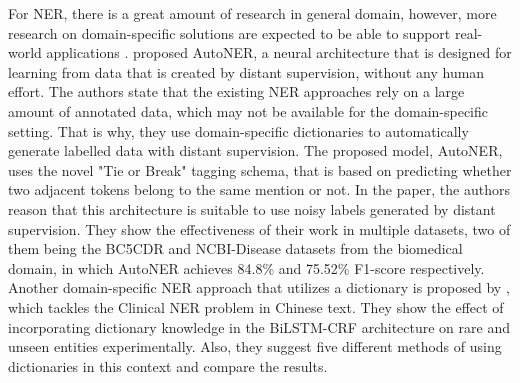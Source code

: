 \documentclass{article}
\theoremstyle{definition}
\theoremstyle{remark}
\begin{document}
For NER, there is a great amount of research in general domain, however, more research on domain-specific solutions are expected to be able to support real-world applications \cite{quote1}. \cite{NERDict2} proposed AutoNER, a neural architecture that is designed for learning from data that is created by distant supervision, without any human effort. The authors state that the existing NER approaches rely on a large amount of annotated data, which may not be available for the domain-specific setting. That is why, they use domain-specific dictionaries to automatically generate labelled data with distant supervision. The proposed model, AutoNER, uses the novel "Tie or Break" tagging schema, that is based on predicting whether two adjacent tokens belong to the same mention or not. In the paper, the authors reason that this architecture is suitable to use noisy labels generated by distant supervision. They show the effectiveness of their work in multiple datasets, two of them being the BC5CDR \cite{bc5cdr} and NCBI-Disease \cite{ncbi} datasets from the biomedical domain, in which AutoNER achieves 84.8\% and 75.52\% F1-score respectively.  Another domain-specific NER approach that utilizes a dictionary is proposed by \cite{MedDict}, which tackles the Clinical NER problem in Chinese text. They show the effect of incorporating dictionary knowledge in the BiLSTM-CRF \cite{BiLSTMCRF} architecture on rare and unseen entities experimentally. Also, they suggest five different methods of using dictionaries in this context and compare the results. 
\end{document}
